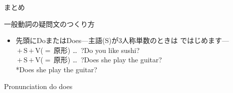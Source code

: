 \documentclass[aspectratio=169,xcolor={dvipsnames,table}]{beamer}
\begin{document}
\begin{frame}[plain]{まとめ}
 

\begin{exampleblock}{一般動詞の疑問文のつくり方}\small
\begin{itemize}[square]
 \item   先頭にDoまたはDoes\hspace{10pt}---主語(S)が3人称単数のときは\,\,ではじめます---\\
	 \,$+$\,S\,$+$\,V{\scriptsize ($=$\,原形)} \ldots\,\,\,?\hfill{}Do you like sushi?\\
	 \,$+$\,S\,$+$\,V{\scriptsize ($=$\,原形)} \ldots\,\,\,?\hfill{}Does she play the guitar?\\
\hfill{}*Does she play the guitar?
\end{itemize}
     \end{exampleblock}



\begin{exampleblock}{Pronunciation}
\mbox{}\hfill{}do \hspace{30pt}does \hfill\mbox{}
\end{exampleblock}

\end{frame}
\end{document}
